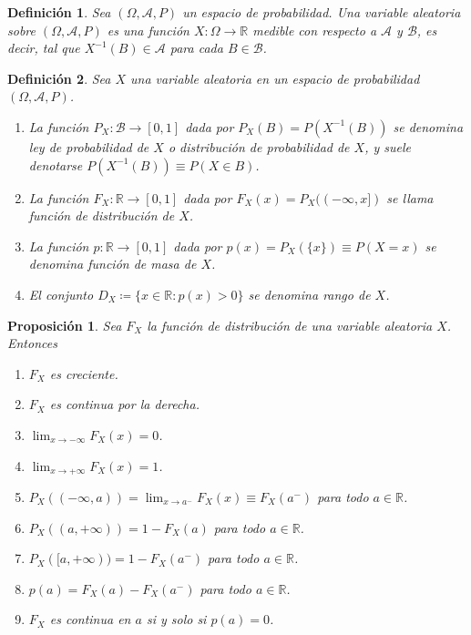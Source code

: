 \documentclass[11pt]{report}
\newtheorem{proposition}{Proposición}
\newtheorem{definition}{Definición}
\theoremstyle{definition}
\newcommand{\R}{\mathbb R}
\begin{document}
\begin{definition}
Sea $(\Omega, \mathcal{A},P)$ un espacio de probabilidad. Una \emph{variable aleatoria sobre $(\Omega,\mathcal{A},P)$} es una función $X \colon \Omega \to \R$ medible con respecto a $\mathcal{A}$ y $\mathcal{B}$, es decir, tal que $X^{-1}(B) \in \mathcal{A}$ para cada $B \in \mathcal{B}$.
\end{definition}

\begin{definition}
Sea $X$ una variable aleatoria en un espacio de probabilidad $(\Omega,\mathcal{A},P)$. 
\begin{enumerate}
    \item La función $P_X \colon \mathcal{B} \to [0,1]$ dada por
    $P_X(B)=P(X^{-1}(B))$
    se denomina \emph{ley de probabilidad de $X$} o \emph{distribución de probabilidad de $X$}, y suele denotarse $P(X^{-1}(B)) \equiv P(X \in B)$.
    \item La función $F_X \colon \R \to [0,1]$ dada por
    $F_X(x)=P_X((-\infty,x])$
    se llama \emph{función de distribución de $X$}.
    \item La función $p \colon \R \to [0,1]$ dada por $p(x) = P_X(\{x\}) \equiv P(X = x)$ se denomina \emph{función de masa de $X$}.
    \item El conjunto $D_X \coloneqq \{x \in \R \colon p(x)> 0\}$ se denomina \emph{rango de $X$}.
\end{enumerate}
\end{definition}

\begin{proposition}
Sea $F_X$ la función de distribución de una variable aleatoria $X$. Entonces
\begin{enumerate}
    \item $F_X$ es creciente.
    \item $F_X$ es continua por la derecha.
    \item $\displaystyle \lim_{x \to -\infty} F_X(x)=0$.
    \item $\displaystyle \lim_{x \to +\infty} F_X(x)=1$.
    \item $\displaystyle P_X((-\infty,a)) = \lim_{x \to a^-}F_X(x) \equiv F_X(a^-)$ para todo $a \in \R$.
    \item $P_X((a,+\infty)) = 1-F_X(a)$ para todo $a \in \R$.
    \item $P_X([a,+\infty)) = 1-F_X(a^-)$ para todo $a \in \R$.
    \item $p(a) = F_X(a)-F_X(a^-)$ para todo $a \in \R$.
    \item $F_X$ es continua en $a$ si y solo si $p(a) = 0$.
\end{enumerate}
\end{proposition}
\end{document}
